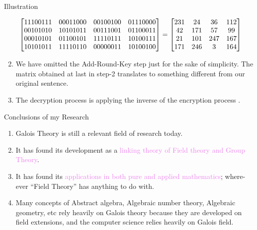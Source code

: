 \documentclass{beamer}
\begin{document}
\begin{frame}[allowframebreaks]{Illustration}
\begin{enumerate}
  \framebreak
  \[\hspace{-5mm}\begin{bmatrix}
      11100111 & 00011000 & 00100100 & 01110000\\
      00101010 & 10101011 & 00111001 & 01100011\\
      00010101 & 01100101 & 11110111 & 10100111\\
      10101011 & 11110110 & 00000011 & 10100100
    \end{bmatrix}=
    \begin{bmatrix}
      231 & 24 & 36 & 112\\
      42 & 171 & 57 & 99\\
      21 & 101 & 247 & 167\\
      171 & 246 & 3 & 164
    \end{bmatrix}
  \]
  \vspace{5mm}

\item We have omitted the Add-Round-Key step just for the sake of simplicity. The matrix obtained at last in step-2 translates to something different from our original sentence.

  \vspace{5mm}

\item The decryption process is applying the inverse of the encryption process \cite{aes}.
\end{enumerate}
\end{frame}

\begin{frame}{Conclusions of my Research}
  \begin{enumerate}
  \item Galois Theory is still a \textcolor{green!50!black}{relevant field of research} today.
  \item It has found its development as a \textcolor{violet}{linking theory of Field theory and Group Theory}.
  \item It has found its \textcolor{violet}{applications in both pure and applied mathematics}; where-ever ``Field Theory'' has anything to do with.
    \item Many concepts of Abstract algebra, Algebraic number theory, Algebraic geometry, etc rely heavily on Galois theory because they are developed on field extensions, and the \textcolor{green!50!black}{computer science relies heavily on Galois field}.
  \end{enumerate}
\end{frame}
\end{document}
